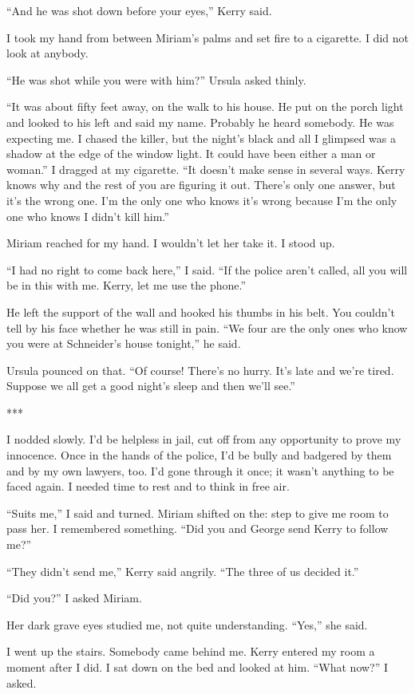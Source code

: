 \documentclass{novel}
\begin{document}
{“And he was shot down before your eyes,” Kerry said.

I took my hand from between Miriam’s palms and set fire to a cigarette. I did not look at anybody.

“He was shot while you were with him?” Ursula asked thinly.

“It was about fifty feet away, on the walk to his house. He put on the porch light and looked to his left and said my name. Probably he heard somebody. He was expecting me. I chased the killer, but the night’s black and all I glimpsed was a shadow at the edge of the window light. It could have been either a man or woman.” I dragged at my cigarette. “It doesn’t make sense in several ways. Kerry knows why and the rest of you are figuring it out. There’s only one answer, but it’s the wrong one. I’m the only one who knows it’s wrong because I’m the only one who knows I didn’t kill him.”

Miriam reached for my hand. I wouldn’t let her take it. I stood up.

“I had no right to come back here,” I said. “If the police aren’t called, all you will be in this with me. Kerry, let me use the phone.”

He left the support of the wall and hooked his thumbs in his belt. You couldn’t tell by his face whether he was still in pain. “We four are the only ones who know you were at Schneider’s house tonight,” he said.

Ursula pounced on that. “Of course! There’s no hurry. It’s late and we’re tired. Suppose we all get a good night’s sleep and then we’ll see.”

***

I nodded slowly. I’d be helpless in jail, cut off from any opportunity to prove my innocence. Once in the hands of the police, I’d be bully and badgered by them and by my own lawyers, too. I’d gone through it once; it wasn’t anything to be faced again. I needed time to rest and to think in free air.

“Suits me,” I said and turned. Miriam shifted on the: step to give me room to pass her. I remembered something. “Did you and George send Kerry to follow me?”

“They didn’t send me,” Kerry said angrily. “The three of us decided it.”

“Did you?” I asked Miriam.

Her dark grave eyes studied me, not quite understanding. “Yes,” she said.

I went up the stairs. Somebody came behind me. Kerry entered my room a moment after I did. I sat down on the bed and looked at him. “What now?” I asked.

}
\end{document}
